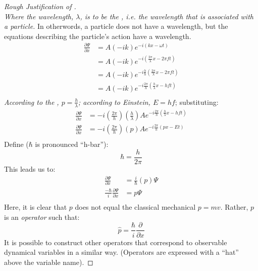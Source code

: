 \begin{proof}[Rough Justification of ]
\begin{equation*}
		\end{equation*}
		\emph{Where the wavelength, $\lambda$, is to be the , i.e. the wavelength that is associated with a particle.}
		In otherwords, a particle does not have a wavelength, but the equations describing the particle's action have a wavelength.
		\begin{align*}
			\frac{\partial \Psi}{\partial x} &= A \left( -ik \right) e^{-i \left( kx-\omega t \right)} \\
			&= A \left( -ik \right) e^{-i \left( \frac{2\pi}{\lambda}x- 2\pi ft \right)} \\
			&= A \left( -ik \right) e^{-i \frac{h}{h} \left( \frac{2\pi}{\lambda}x- 2\pi ft \right)} \\
			&= A \left( -ik \right) e^{-i \frac{2\pi}{h} \left( \frac{h}{\lambda}x- hft \right)} \\
		\end{align*}
		\emph{According to the , $p = \frac{h}{\lambda}$; according to Einstein, $E = hf$}; substituting:
		\begin{align*}
			\frac{\partial \Psi}{\partial x} &= -i \left( \frac{2 \pi}{h} \right) \left( \frac{h}{\lambda} \right) A e^{-i \frac{2\pi}{h} \left( \frac{h}{\lambda}x- hft \right)} \\ 
			\frac{\partial \Psi}{\partial x} &= -i \left( \frac{2 \pi}{h} \right) \left( p \right) A e^{-i \frac{2\pi}{h} \left( px- Et \right)} \\
		\end{align*}
		Define ($\hbar$ is pronounced ``h-bar''):
		\begin{equation*}
			\hbar = \frac{h}{2 \pi}
		\end{equation*}
		This leads us to:
		\begin{align*}
			\frac{\partial \Psi}{\partial x} &= \frac{i}{\hbar} \left( p \right) \Psi \\
			\frac{-\hbar}{i} \frac{\partial \Psi}{\partial x} &= p \Psi \\
		\end{align*}
		Here, it is clear that $p$ does not equal the classical mechanical $p = mv$. Rather, $p$ is an \emph{operator} such that:
		\begin{equation*}
			\hat{p} = \frac{\hbar}{i} \frac{\partial}{\partial x}
		\end{equation*}
		It is possible to construct other operators that correspond to observable dynamical variables in a similar way. (Operators are expressed with a ``hat'' above the variable name). \newline

\end{proof}
